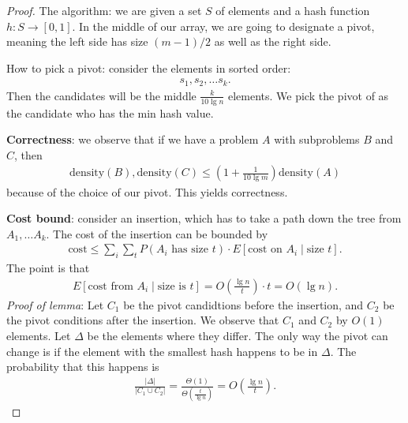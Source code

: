 \documentclass{report}
\begin{document}
\begin{proof}
    The algorithm: we are given a set $S$ of elements and a hash function $h:S \to [0,1]$. In the middle of our array, we are going to designate a pivot, meaning the left side has size $(m-1)/2$ as well as the right side.

    How to pick a pivot: consider the elements in sorted order:
    \begin{align*}
        s_1, s_2, \ldots s_k.
    \end{align*}
    Then the candidates will be the middle $\frac{k}{10 \lg n}$ elements. We pick the pivot of as the candidate who has the min hash value.

    \noindent \textbf{Correctness}: we observe that if we have a problem $A$ with subproblems $B$ and $C$, then 
    \begin{align*}
        \mathrm{density}(B), \mathrm{density}(C) \leq \left(1 + \frac{1}{10 \lg m}\right)\mathrm{density}(A)
    \end{align*}
    because of the choice of our pivot. This yields correctness.

    \noindent \textbf{Cost bound}: consider an insertion, which has to take a path down the tree from $A_1, \ldots A_k$. The cost of the insertion can be bounded by 
    \begin{align*}
        \mathrm{cost} \leq \sum_i \sum_t P(\text{$A_i$ has size $t$}) \cdot E[\text{cost on $A_i$} \mid \text{size $t$}].
    \end{align*}
    \noindent The point is that 
    \begin{align*}
        E[\text{cost from $A_i$} \mid \text{size is $t$}] = O\left(\frac{\lg n}{t}\right) \cdot t = O(\lg n).
    \end{align*}
    \noindent \textit{Proof of lemma}: Let $C_1$ be the pivot candidtions before the insertion, and $C_2$ be the pivot conditions after the insertion. We observe that $C_1$ and $C_2$ by $O(1)$ elements. Let $\Delta$ be the elements where they differ. The only way the pivot can change is if the element with the smallest hash happens to be in $\Delta$. The probability that this happens is 
    \begin{align*}
        \frac{|\Delta|}{|C_1 \cup C_2|} = \frac{\Theta(1)}{\Theta\left(\frac{t}{\lg n}\right)} = O\left(\frac{\lg n}{t}\right).
    \end{align*}
\end{proof}
\end{document}
